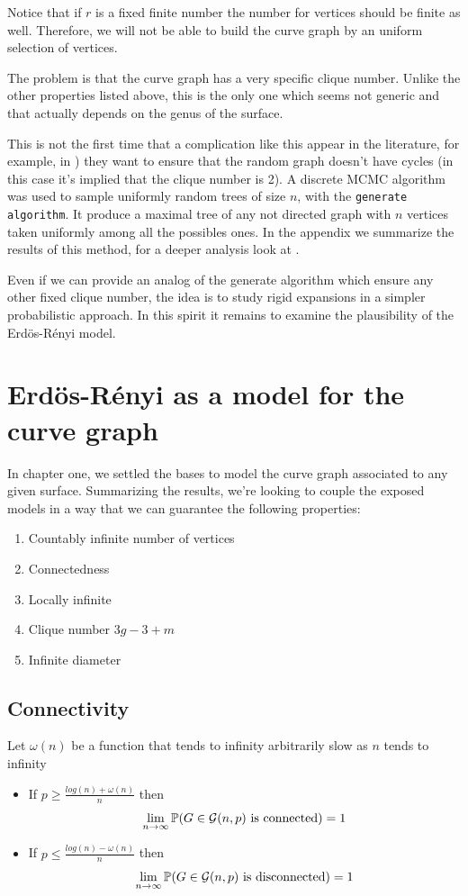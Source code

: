Notice that if $r$ is a fixed finite number the number for vertices should be finite as well. Therefore, we will not be able to build the curve graph by an uniform selection of vertices. 

The problem is that the curve graph has a very specific clique number. Unlike the other properties listed above, this is the only one which seems not generic and that actually depends on the genus of the surface.

This is not the first time that a complication like this appear in the literature, for example, in \cite{Alcazar15}) they want to ensure that the random graph doesn't have cycles (in this case it's implied that the clique number is 2). A discrete MCMC algorithm was used to sample uniformly random trees of size $n$, with the \texttt{generate algorithm}. It produce a maximal tree of any not directed graph with $n$ vertices taken uniformly among all the possibles ones. In the appendix we summarize the results of this method, for a deeper analysis look at \cite{Broder89}.

Even if we can provide an analog of the generate algorithm which ensure any other fixed clique number, the idea is to study rigid expansions in a simpler probabilistic approach. In this spirit it remains to examine the plausibility of the Erdös-Rényi model.

\section{Erdös-Rényi as a model for the curve graph}
In chapter one, we settled the bases to model the curve graph associated to any given surface. Summarizing the results, we're looking to couple the exposed models in a way that we can guarantee the following properties:

\begin{enumerate}
\item Countably infinite number of vertices
\item Connectedness
\item Locally infinite
\item Clique number $3g-3+m$
\item Infinite diameter
\end{enumerate}

\subsection{Connectivity}
\begin{theorem}
Let $\omega(n)$ be a function that tends to infinity arbitrarily slow as $n$ tends to infinity
\begin{itemize}
\item If $p\geq \frac{log(n)+ \omega(n)}{n}$ then 
$$\lim_{n \to \infty} \mathbb{P}(G \in \mathcal{G}(n,p) \text{ is connected}) = 1$$
\item If $p\leq \frac{log(n)- \omega(n)}{n}$ then
$$\lim_{n \to \infty} \mathbb{P}(G \in \mathcal{G}(n,p) \text{ is disconnected}) = 1$$
\end{itemize}
\end{theorem}
 
